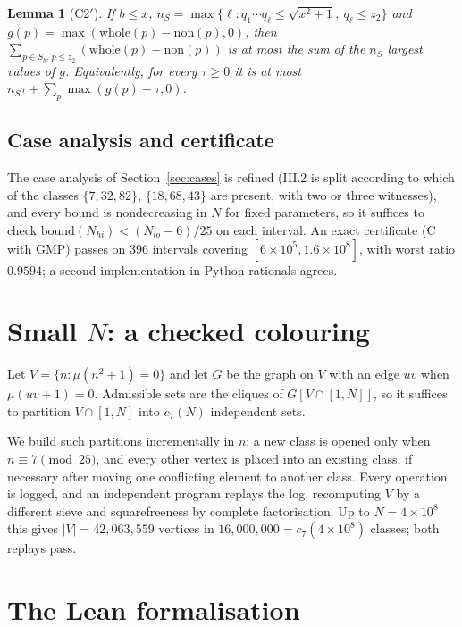 \documentclass[11pt]{amsart}
\newtheorem{lemma}[theorem]{Lemma}
\theoremstyle{definition}
\theoremstyle{remark}
\begin{document}
\begin{lemma}[C2$'$]
If $b\le x$, $n_S=\max\{\ell: q_1\cdots q_\ell\le\sqrt{x^2+1},\ q_\ell\le z_2\}$ and
$g(p)=\max(\mathrm{whole}(p)-\mathrm{non}(p),0)$, then
$\sum_{p\in S_b,\,p\le z_2}(\mathrm{whole}(p)-\mathrm{non}(p))$ is at most the sum of
the $n_S$ largest values of $g$. Equivalently, for every $\tau\ge0$ it is at most
$n_S\tau+\sum_p\max(g(p)-\tau,0)$.
\end{lemma}

\subsection{Case analysis and certificate}
The case analysis of Section~\ref{sec:cases} is refined (III.2 is split according
to which of the classes $\{7,32,82\}$, $\{18,68,43\}$ are present, with two or
three witnesses), and every bound is nondecreasing in $N$ for fixed parameters, so
it suffices to check $\mathrm{bound}(N_{hi})<(N_{lo}-6)/25$ on each interval. An
exact certificate (C with GMP) passes on 396 intervals covering
$[6\times10^5,1.6\times10^8]$, with worst ratio $0.9594$; a second implementation in
Python rationals agrees.

\section{Small $N$: a checked colouring}\label{sec:small}

Let $V=\{n:\mu(n^2+1)=0\}$ and let $G$ be the graph on $V$ with an edge $uv$ when
$\mu(uv+1)=0$. Admissible sets are the cliques of $G[V\cap[1,N]]$, so it suffices
to partition $V\cap[1,N]$ into $c_7(N)$ independent sets.

We build such partitions incrementally in $n$: a new class is opened only when
$n\equiv7\pmod{25}$, and every other vertex is placed into an existing class, if
necessary after moving one conflicting element to another class. Every operation is
logged, and an independent program replays the log, recomputing $V$ by a different
sieve and squarefreeness by complete factorisation. Up to $N=4\times10^8$ this gives
$|V|=42{,}063{,}559$ vertices in $16{,}000{,}000=c_7(4\times10^8)$ classes; both
replays pass.

\section{The Lean formalisation}\label{sec:lean}
\end{document}
